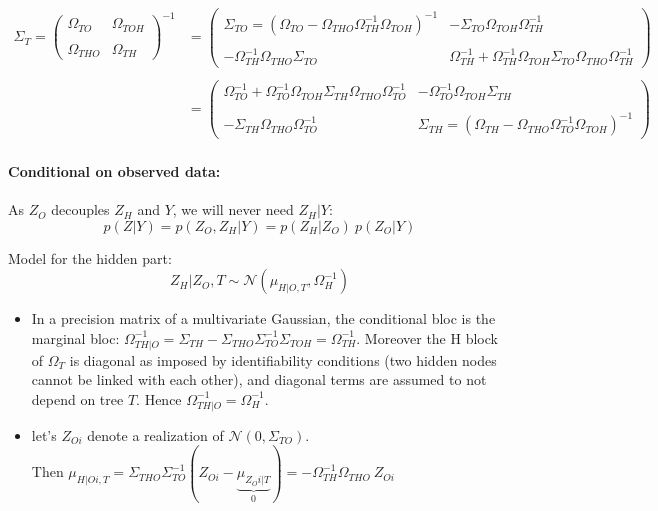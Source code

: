 \documentclass[11pt,a4paper]{article}
\begin{document}
\begin{align*}
 \Sigma_T=
  \left( {\begin{array}{cc}
  \Omega_{TO} &  \Omega_{TOH}\\\\
  \Omega_{THO} & \Omega_{TH}
  \end{array} } \right)^{-1} &=
  \left( {\begin{array}{cc}
  \Sigma_{TO} =( \Omega_{TO} - \Omega_{THO}\Omega_{TH}^{-1}\Omega_{TOH})^{-1} &  - \Sigma_{TO} \Omega_{TOH}\Omega_{TH}^{-1}\\\\
 -\Omega_{TH}^{-1}\Omega_{THO}\Sigma_{TO} & \Omega_{TH}^{-1}+\Omega_{TH}^{-1}\Omega_{TOH}\Sigma_{TO}\Omega_{THO}\Omega_{TH}^{-1}
  \end{array} } \right)\\\\
  &=   \left( {\begin{array}{cc}
   \Omega_{TO}^{-1}+\Omega_{TO}^{-1}\Omega_{TOH}\Sigma_{TH}\Omega_{THO}\Omega_{TO}^{-1} & -\Omega_{TO}^{-1}\Omega_{TOH}\Sigma_{TH} \\\\
    -\Sigma_{TH}\Omega_{THO}\Omega_{TO}^{-1}&  \Sigma_{TH}= (\Omega_{TH} - \Omega_{THO}\Omega_{TO}^{-1}\Omega_{TOH})^{-1} 
   \end{array} } \right)
\end{align*}
  


\paragraph{Conditional on observed data:\\}


As $Z_O$ decouples $Z_H$ and $Y$, we will never need $Z_H|Y$:
$$ p(Z|Y) = p(Z_O,Z_H | Y) = p(Z_H|Z_O) \: p(Z_O|Y) $$



Model for the hidden part: $$Z_H|Z_O,T \sim \mathcal{N}(\mu_{H|O,T}, \Omega_{H}^{-1})$$ 

\begin{itemize}
\item In a precision matrix of a multivariate Gaussian, the conditional bloc is the marginal bloc:  $\Omega_{TH|O}^{-1} = \Sigma_{TH} -\Sigma_{THO}\Sigma_{TO}^{-1}\Sigma_{TOH} = \Omega_{TH}^{-1}$. Moreover the H block of $\Omega_T$ is diagonal as imposed by identifiability conditions (two hidden nodes cannot be linked with each other), and diagonal terms are assumed to not depend on tree $T$. Hence $\Omega_{TH|O}^{-1}=\Omega_{H}^{-1}$.

\item let's $Z_{Oi}$ denote a realization of $\mathcal{N}(0,\Sigma_{TO}) $.\\
 Then $\displaystyle  \mu_{H|Oi,T} = \Sigma_{THO}\Sigma_{TO}^{-1}(Z_{Oi}-\underbrace{\mu_{Z_Oi|T}}_{0}) 
 = -\Omega_{TH}^{-1}\Omega_{THO} \: Z_{Oi}
$\\
\end{itemize}
\end{document}
